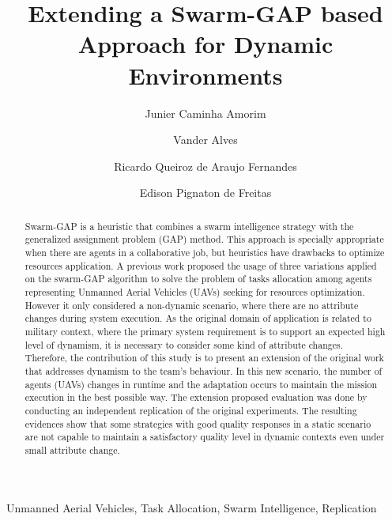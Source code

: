 \documentclass[review]{elsarticle}
\newcommand{\uavs}{UAVs}
\begin{document}
\begin{frontmatter}
	
\title{Extending a Swarm-GAP based Approach for Dynamic Environments}

\author[unbaddress]{Junier Caminha Amorim}

\author[unbaddress]{Vander Alves}

\author[brazilianarmyaddress]{Ricardo Queiroz de Araujo Fernandes}

\author[ufrgsaddress]{Edison Pignaton de Freitas}

\address[unbaddress]{Computation Science Department University of Brasilia, Brazil}
\address[ufrgsaddress]{Institute of Informatics Federal University of Rio Grande do Sul, Brazil}
\address[brazilianarmyaddress]{Software Development Center - Brazilian Army, Brazil}

\begin{abstract}
Swarm-GAP is a heuristic that combines a swarm intelligence strategy with the generalized assignment problem (GAP) method. This approach is specially appropriate when there are agents in a collaborative job, but heuristics have drawbacks to optimize resources application. A previous work proposed the usage of three variations applied on the swarm-GAP algorithm to solve the problem of tasks allocation among agents representing Unmanned Aerial Vehicles (\uavs) seeking for resources optimization. However it only considered a non-dynamic scenario, where there are no attribute changes during system execution. As the original domain of application is related to military context, where the primary system requirement is to support an expected high level of dynamism, it is necessary to consider some kind of attribute changes. Therefore, the contribution of this study is to present an extension of the original work that addresses dynamism to the team's behaviour. In this new scenario, the number of agents (\uavs) changes in runtime and the adaptation occurs to maintain the mission execution in the best possible way. The extension proposed evaluation was done by conducting an independent replication of the original experiments. The resulting evidences show that some strategies with good quality responses in a static scenario are not capable to maintain a satisfactory quality level in dynamic contexts even under small attribute change. 
\end{abstract}


\begin{keyword}
Unmanned Aerial Vehicles, Task Allocation, Swarm Intelligence, Replication
\end{keyword}

\end{frontmatter}
\end{document}

